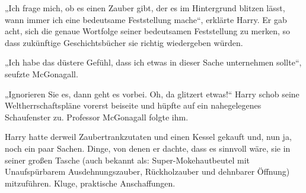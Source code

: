 „Ich frage mich, ob es einen Zauber gibt, der es im Hintergrund blitzen lässt, wann immer ich eine bedeutsame Feststellung mache“, erklärte Harry. Er gab acht, sich die genaue Wortfolge seiner bedeutsamen Feststellung zu merken, so dass zukünftige Geschichtsbücher sie richtig wiedergeben würden.

„Ich habe das düstere Gefühl, dass ich etwas in dieser Sache unternehmen sollte“, seufzte McGonagall.

„Ignorieren Sie es, dann geht es vorbei. Oh, da glitzert etwas!“ Harry schob seine Weltherrschaftspläne vorerst beiseite und hüpfte auf ein nahegelegenes Schaufenster zu. Professor McGonagall folgte ihm.

\later

Harry hatte derweil Zaubertrankzutaten und einen Kessel gekauft und, nun ja, noch ein paar Sachen. Dinge, von denen er dachte, dass es sinnvoll wäre, sie in seiner großen Tasche (auch bekannt als: Super-Mokehautbeutel  mit Unaufspürbarem Ausdehnungszauber, Rückholzauber und dehnbarer Öffnung) mitzuführen. Kluge, praktische Anschaffungen.

